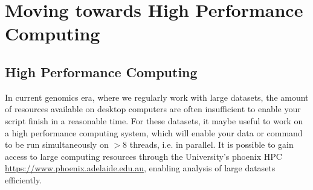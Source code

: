 \section{Moving towards High Performance Computing}
%
%
%

\subsection{High Performance Computing}
\begin{information}
In current genomics era, where we regularly work with large datasets, the amount of resources available on desktop computers are often insufficient to enable your script finish in a reasonable time. 
For these datasets, it maybe useful to work on a high performance computing system, which will enable your data or command to be run simultaneously on $>8$ threads, i.e. in parallel.
It is possible to gain access to large computing resources through the University's phoenix HPC \url{https://www.phoenix.adelaide.edu.au}, enabling analysis of large datasets efficiently.\\ 

\end{information}

